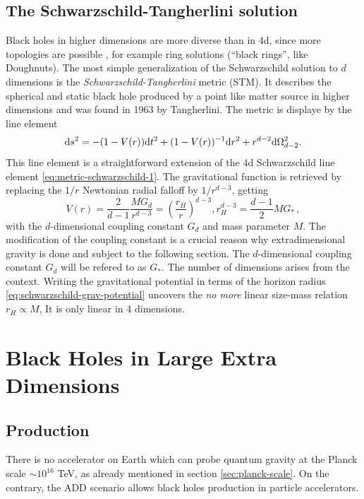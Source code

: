 \documentclass[12pt,a4paper]{report}
\numberwithin{equation}{chapter}
\begin{document}
\subsection{The Schwarzschild-Tangherlini solution}
Black holes in higher dimensions are more diverse than in 4d, since more topologies are possible \cite{ReallLRR}, for example ring solutions (``black rings'', like Doughnuts). The most simple generalization of the Schwarzschild solution to $d$ dimensions is the \emph{Schwarzschild-Tangherlini} metric (STM). It describes the spherical and static black hole produced by a point like matter source in higher dimensions and was found in 1963 by Tangherlini. The metric is displaye by the line element
\begin{equation}\label{eq:metric-schwarzschild-n}
\mathrm{d} s^2 = - (1-V(r)) \mathrm{d} t^2 + (1-V(r))^{-1} \mathrm{d} r^2 + r^{d-2} \mathrm{d} \Omega_{d-2}^2.
\end{equation}
This line element is a straightforward extension of the 4d Schwarzschild line element \eqref{eq:metric-schwarzschild-1}. The gravitational function is retrieved by replacing the $1/r$ Newtonian  radial falloff by $1/r^{d-3}$, getting \cite{ReallLRR}
\begin{equation}\label{eq:schwarzschild-grav-potential}
V(r) = \frac{2}{d-1} \frac{M G_d}{r^{d-3}} = \left( \frac{r_H}{r} \right)^{d-3},
r_H^{d-3} = \frac{d-1}{2} M G_*
\,,
\end{equation}
with the $d$-dimensional coupling constant $G_d$ and mass parameter $M$. The modification of the coupling constant is a crucial reason why extradimensional gravity is done and subject to the following section. The $d$-dimensional coupling constant $G_d$ will be refered to as $G_*$. The number of dimensions arises from the context. Writing the gravitational potential in terms of the horizon radius \eqref{eq:schwarzschild-grav-potential} uncovers the \emph{no more} linear size-mass relation $r_H \propto M$, It is only linear in 4 dimensions.


\clearpage
\section{Black Holes in Large Extra Dimensions}
\subsection{Production}
There is no accelerator on Earth which can probe quantum gravity at the Planck scale $\sim 10^{16}$ TeV, as already mentioned in section \ref{sec:planck-scale}. On the contrary, the ADD scenario allows black holes production in particle accelerators.
\end{document}
